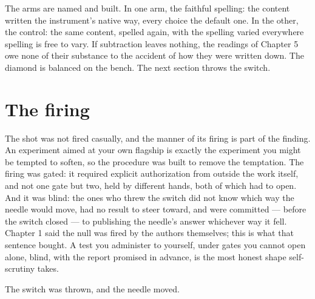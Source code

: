 The arms are named and built. In one arm, the faithful spelling: the content
written the instrument's native way, every choice the default one. In the other,
the control: the same content, spelled again, with the spelling varied everywhere
spelling is free to vary. If subtraction leaves nothing, the readings of Chapter 5
owe none of their substance to the accident of how they were written down. The
diamond is balanced on the bench. The next section throws the switch.

\section{The firing}

The shot was not fired casually, and the manner of its firing is part of the finding.
An experiment aimed at your own flagship is exactly the experiment you might be
tempted to soften, so the procedure was built to remove the temptation. The firing
was gated: it required explicit authorization from outside the work itself, and not
one gate but two, held by different hands, both of which had to open. And it was
blind: the ones who threw the switch did not know which way the needle would move,
had no result to steer toward, and were committed --- before the switch closed ---
to publishing the needle's answer whichever way it fell. Chapter 1 said the null was
fired by the authors themselves; this is what that sentence bought. A test you
administer to yourself, under gates you cannot open alone, blind, with the report
promised in advance, is the most honest shape self-scrutiny takes.

The switch was thrown, and the needle moved.

